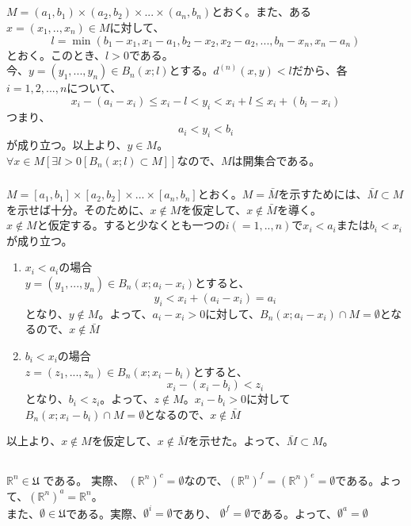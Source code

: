 \documentclass{jsarticle}
\begin{document}
\subsection{}
\subsubsection{}
$M=(a_1,b_1)\times(a_2,b_2)\times ... \times(a_n, b_n)$とおく。また、ある$x=(x_1, ..,x_n)\in M$に対して、
\[l=\min (b_1-x_1 , x_1-a_1, b_2-x_2, x_2-a_2,...,b_n-x_n, x_n-a_n)\]
とおく。このとき、$l>0$である。\\
今、$y=(y_1,...,y_n)\in B_n(x;l)$とする。$d^{(n)}(x,y) < l$だから、各$i=1,2,...,n$について、
\[x_i-(a_i-x_i) \leq x_i-l < y_i < x_i + l \leq x_i + (b_i-x_i) \]
つまり、
\[ a_i < y_i < b_i\]
が成り立つ。以上より、$y\in M$。\\
$\forall x\in M[\exists l > 0 [B_n(x;l)\subset M]]$なので、$M$は開集合である。


\subsubsection{}
$M=[a_1,b_1]\times[a_2,b_2]\times ... \times[a_n, b_n]$とおく。$M=\bar{M}$を示すためには、$\bar{M}\subset M$を示せば十分。そのために、$x\notin M$を仮定して、$x\notin \bar{M}$を導く。\\
$x\notin M$と仮定する。すると少なくとも一つの$i(=1,..,n)$で$x_i<a_i$または$b_i < x_i$が成り立つ。
\begin{enumerate}
\item $x_i < a_i$の場合\\
$y=(y_1,...,y_n)\in B_n(x; a_i-x_i)$とすると、
\[y_i < x_i + (a_i-x_i)= a_i\]
となり、$y\notin M$。よって、$a_i-x_i>0$に対して、$B_n(x;a_i-x_i)\cap M = \emptyset$となるので、$x\notin \bar{M}$
\item $b_i < x_i$の場合\\
$z=(z_1,...,z_n)\in B_n(x; x_i-b_i)$とすると、
\[  x_i - (x_i - b_i) < z_i\]
となり、$b_i < z_i$。よって、$z\notin M$。$x_i-b_i >0$に対して$B_n(x;x_i-b_i)\cap M = \emptyset$となるので、$x\notin \bar{M}$
\end{enumerate}
以上より、$x\notin M$を仮定して、$x\notin \bar{M}$を示せた。よって、$\bar{M} \subset M$。


\subsection{}
\subsubsection{}
$\mathbb{R}^n\in \mathfrak{U}$ である。
実際、
${(\mathbb{R}^n)}^c=\emptyset$なので、${(\mathbb{R}^n)}^f={(\mathbb{R}^n)}^e=\emptyset$である。よって、${(\mathbb{R}^n)}^a=\mathbb{R}^n$。\\
また、$\emptyset\in\mathfrak{U}$である。実際、$\emptyset^i=\emptyset$であり、 $\emptyset^f=\emptyset$である。よって、$\emptyset^a=\emptyset$
\end{document}
